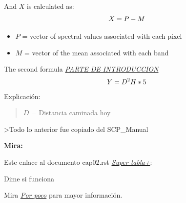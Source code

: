 \documentclass[letterpaper,10pt,spanish]{sphinxmanual}
\begin{document}
And \(X\) is calculated as:
\begin{gather}
\begin{split}X = P - M\end{split}\notag
\end{gather}\begin{itemize}
\item {} 
\(P\) = vector of spectral values associated with each pixel

\item {} 
\(M\) = vector of the mean associated with each band

\end{itemize}

The second formula {\hyperref[cap01:introduccionr]{\emph{PARTE DE INTRODUCCION}}}
\begin{gather}
\begin{split}Y = D^2 H*5\end{split}\notag
\end{gather}
Explicación:
\begin{quote}

\(D\) = Distancia caminada hoy
\end{quote}

\textgreater{}Todo lo anterior fue copiado del SCP\_Manual

\textbf{Mira:}

Este enlace al documento cap02.rst {\hyperref[cap02:sueldo]{\emph{Super tabla+}}}:

Dime si funciona

Mira {\hyperref[cap01:elsuelo]{\emph{Por poco}}} para mayor información.



\renewcommand{\indexname}{Índice}
\printindex
\end{document}
